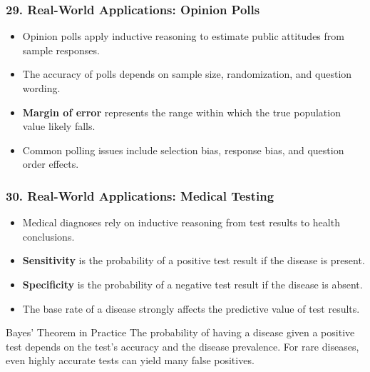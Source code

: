 \documentclass{beamer}
\begin{document}
\begin{frame}
\frametitle{29. Real-World Applications: Opinion Polls}
\begin{itemize}
\item Opinion polls apply inductive reasoning to estimate public attitudes from sample responses.
\item The accuracy of polls depends on sample size, randomization, and question wording.
\item \textbf{Margin of error} represents the range within which the true population value likely falls.
\item Common polling issues include selection bias, response bias, and question order effects.
\end{itemize}

\end{frame}

\begin{frame}
\frametitle{30. Real-World Applications: Medical Testing}
\begin{itemize}
\item Medical diagnoses rely on inductive reasoning from test results to health conclusions.
\item \textbf{Sensitivity} is the probability of a positive test result if the disease is present.
\item \textbf{Specificity} is the probability of a negative test result if the disease is absent.
\item The base rate of a disease strongly affects the predictive value of test results.
\end{itemize}

\begin{block}{Bayes' Theorem in Practice}
The probability of having a disease given a positive test depends on the test's accuracy and the disease prevalence. For rare diseases, even highly accurate tests can yield many false positives.
\end{block}
\end{frame}
\end{document}
